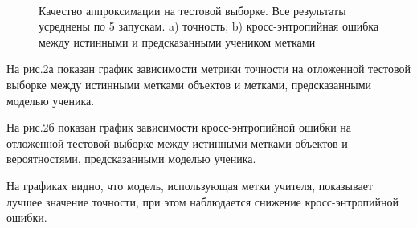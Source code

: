 \begin{figure}[h!t]\center
{}
\\
\caption{Качество аппроксимации на тестовой выборке. Все результаты усреднены по 5 запускам. a) точность; b) кросс-энтропийная ошибка между истинными и предсказанными учеником метками}
\end{figure}

На рис.2а показан график зависимости метрики точности на отложенной тестовой выборке между истинными метками объектов и метками, предсказанными моделью ученика.

На рис.2б показан график зависимости кросс-энтропийной ошибки на отложенной тестовой выборке между истинными метками объектов и вероятностями, предсказанными моделью ученика.

На графиках видно, что модель, использующая метки учителя, показывает лучшее значение точности, при этом наблюдается снижение кросс-энтропийной ошибки.


